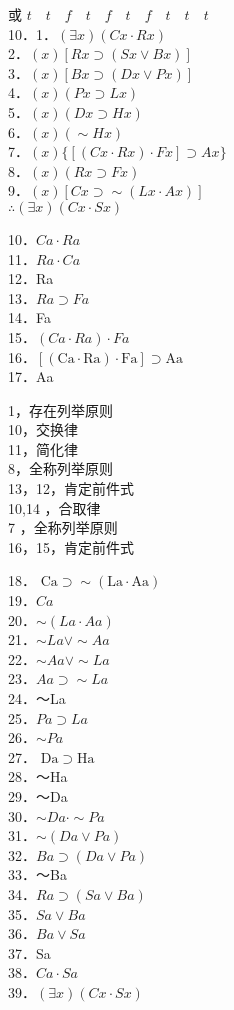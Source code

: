 或 $t \quad t \quad f \quad t \quad f \quad t \quad f \quad t \quad t \quad t$\\
10．1．$(\exists x)(C x \cdot R x)$\\
2．$(x)[R x \supset(S x \vee B x)]$\\
3．$(x)[B x \supset(D x \vee P x)]$\\
4．$(x)(P x \supset L x)$\\
5．$(x)(D x \supset H x)$\\
6．$(x)(\sim H x)$\\
7．$(x)\{[(C x \cdot R x) \cdot F x] \supset A x\}$\\
8．$(x)(R x \supset F x)$\\
9．$(x)[C x \supset \sim(L x \cdot A x)]$\\
$\therefore(\exists x)(C x \cdot S x)$

10．$C a \cdot R a$\\
11．$R a \cdot C a$\\
12．Ra\\
13．$R a \supset F a$\\
14．Fa\\
15．$(C a \cdot R a) \cdot F a$\\
16．$[(\mathrm{Ca} \cdot \mathrm{Ra}) \cdot \mathrm{Fa}] \supset \mathrm{Aa}$\\
17．Aa

1，存在列举原则\\
10，交换律\\
11，简化律\\
8，全称列举原则\\
13，12，肯定前件式\\
10,14 ，合取律\\
7 ，全称列举原则\\
16，15，肯定前件式

18． $\mathrm{Ca} \supset \sim(\mathrm{La} \cdot \mathrm{Aa})$\\
19．$C a$\\
20．$\sim(L a \cdot A a)$\\
21．$\sim L a \vee \sim A a$\\
22．$\sim A a \vee \sim L a$\\
23．$A a \supset \sim L a$\\
24．～La\\
25．$P a \supset L a$\\
26．$\sim P a$\\
27． $\mathrm{Da} \supset \mathrm{Ha}$\\
28．～Ha\\
29．～Da\\
30．$\sim D a \cdot \sim P a$\\
31．$\sim(D a \vee P a)$\\
32．$B a \supset(D a \vee P a)$\\
33．～Ba\\
34．$R a \supset(S a \vee B a)$\\
35．$S a \vee B a$\\
36．$B a \vee S a$\\
37．Sa\\
38．$C a \cdot S a$\\
39．$(\exists x)(C x \cdot S x)$

